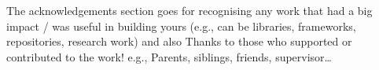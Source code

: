 The acknowledgements section goes for recognising any work that had a big impact / was useful in building yours (e.g., can be libraries, frameworks, repositories, research work) and also Thanks to those who supported or contributed to the work! e.g., Parents, siblings, friends, supervisor\ldots